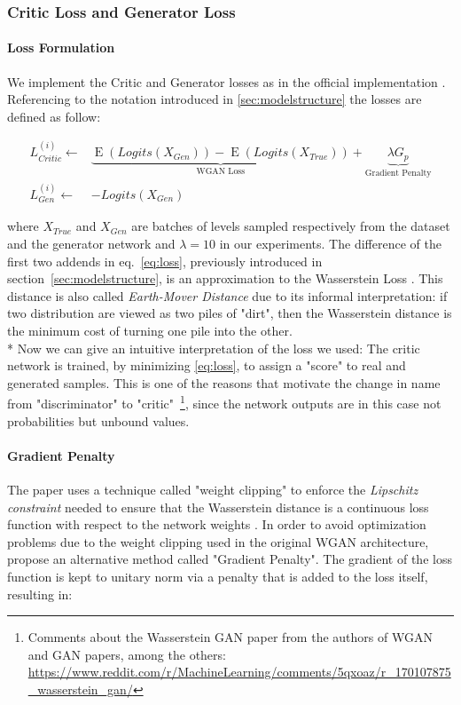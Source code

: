 \subsubsection{Critic Loss and Generator Loss}
\paragraph{Loss Formulation}
We implement the Critic and Generator losses as in the  official implementation \cite{wgangp-imple}. Referencing to the notation introduced in \ref{sec:modelstructure} the losses are defined as follow:

\begin{equation}
\label{eq:loss}
 \begin{split}
L_{Critic}^{(i)} \gets & \underbrace{\operatorname{E}(Logits(X_{Gen})) - \operatorname{E}(Logits(X_{True}))}_{\text{WGAN Loss}} + \underbrace {\lambda G_p}_{\text{Gradient Penalty}} \\
L_{Gen}^{(i)} \gets & -Logits(X_{Gen}) 
\end{split}
\end{equation}

where $X_{True}$ and $X_{Gen}$ are batches of levels sampled respectively from the dataset and the generator network and $\lambda = 10$ in our experiments.
The difference of the first two addends in eq.~\ref{eq:loss}, previously introduced in section~\ref{sec:modelstructure}, is an approximation to the Wasserstein Loss \cite[\S~3]{wgan}. This distance is also called \textit{Earth-Mover Distance} due to its informal interpretation: if two distribution are viewed as two piles of "dirt", then the Wasserstein distance is the minimum cost of turning one pile into the other. \\*
Now we can give an intuitive interpretation of the loss we used: The critic network is trained, by minimizing \ref{eq:loss}, to assign a "score" to real and generated samples. This is one of the reasons that motivate the change in name from "discriminator" to "critic"~\footnote{ Comments about the Wasserstein GAN paper from the authors of WGAN and GAN papers, among the others: \url{https://www.reddit.com/r/MachineLearning/comments/5qxoaz/r_170107875_wasserstein_gan/}}, since the network outputs are in this case not probabilities but unbound values.

\paragraph{Gradient Penalty} The  paper uses a technique called "weight clipping" to enforce the \textit{Lipschitz constraint} needed to ensure that the Wasserstein distance is a continuous loss function with respect to the network weights \cite[\S2]{wgan}. In order to avoid optimization problems due to the weight clipping used in the original WGAN architecture, \cite{wgangp} propose an alternative method called "Gradient Penalty". The gradient of the loss function is kept to unitary norm via a penalty that is added to the loss itself, resulting in:



